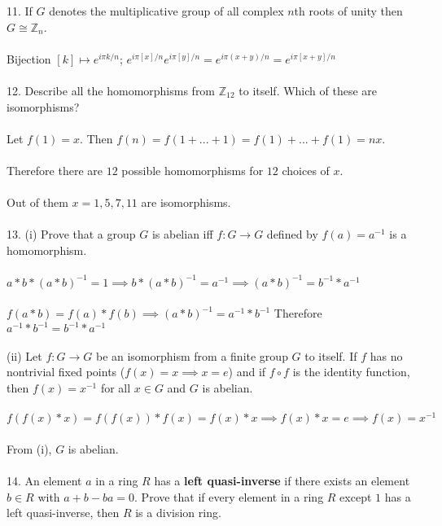 \documentclass{article}
\begin{document}
\begin{siderules}
\color{blue} 11. If \(G\) denotes the multiplicative group of all complex \(n\)th roots of unity 
then \(G\cong\mathbb{Z}_{n}\).\\\\\color{black}
\null\qquad Bijection \([k]\mapsto e^{i\pi k/n}\); \(e^{i\pi [x]/n}e^{i\pi [y]/n}=e^{i\pi (x+y)/n}=e^{i\pi [x+y]/n}\)\\\\
\color{blue} 12. Describe all the homomorphisms from \(\mathbb{Z}_{12}\) to itself. Which of these are isomorphisms?\color{black}\\\\
\null\qquad Let \(f(1)=x\). Then \(f(n)=f(1+...+1)=f(1)+...+f(1)=nx\).\\\\
\null\qquad Therefore there are \(12\) possible homomorphisms for \(12\) choices of \(x\).\\\\
\null\qquad Out of them \(x=1,5,7,11\) are isomorphisms.\\\\
\color{blue} 13. (i) Prove that a group \(G\) is abelian iff \(f:G\to G\) defined by \(f(a)=a^{-1}\) is a homomorphism.\\\\\color{black}
\null\qquad \(a*b*(a*b)^{-1}=1\implies b*(a*b)^{-1}=a^{-1}\implies (a*b)^{-1}=b^{-1}*a^{-1}\)\\\\
\null\qquad \(f(a*b)=f(a)*f(b)\implies (a*b)^{-1}=a^{-1}*b^{-1}\) Therefore \(a^{-1}*b^{-1}=b^{-1}*a^{-1}\)\\\\
\color{blue} (ii) Let \(f:G\to G\) be an isomorphism from a finite group \(G\) to itself. If \(f\) has no 
nontrivial fixed points (\(f(x)=x\implies x=e\)) and if \(f\circ f\) is the identity function, 
then \(f(x)=x^{-1}\) for all \(x\in G\) and \(G\) is abelian.\\\\\color{black}
\null\qquad \(f(f(x)*x)=f(f(x))*f(x)=f(x)*x\implies f(x)*x=e\implies f(x)=x^{-1}\)\\\\
\null\qquad From \color{gray}(i)\color{black}, \(G\) is abelian.\\\\
\color{blue} 14. An element \(a\) in a ring \(R\) has a \textbf{left quasi-inverse} if there exists 
an element \(b\in R\) with \(a+b-ba=0\). Prove that if every element in a ring \(R\) 
except \(1\) has a left quasi-inverse, then \(R\) is a division ring.\\\\\color{black}

\end{siderules}
\end{document}
